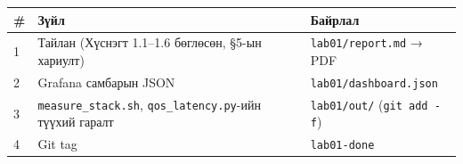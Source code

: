 \begingroup\scriptsize\begin{longtable}[]{@{}lll@{}}
\toprule
\begin{minipage}[b]{0.30\columnwidth}\raggedright
\#\strut
\end{minipage} & \begin{minipage}[b]{0.30\columnwidth}\raggedright
Зүйл\strut
\end{minipage} & \begin{minipage}[b]{0.30\columnwidth}\raggedright
Байрлал\strut
\end{minipage}\tabularnewline
\midrule
\endhead
\begin{minipage}[t]{0.30\columnwidth}\raggedright
1\strut
\end{minipage} & \begin{minipage}[t]{0.30\columnwidth}\raggedright
Тайлан (Хүснэгт 1.1--1.6 бөглөсөн, §5-ын хариулт)\strut
\end{minipage} & \begin{minipage}[t]{0.30\columnwidth}\raggedright
\texttt{lab01/report.md} → PDF\strut
\end{minipage}\tabularnewline
\begin{minipage}[t]{0.30\columnwidth}\raggedright
2\strut
\end{minipage} & \begin{minipage}[t]{0.30\columnwidth}\raggedright
Grafana самбарын JSON\strut
\end{minipage} & \begin{minipage}[t]{0.30\columnwidth}\raggedright
\texttt{lab01/\allowbreak{}dashboard.\allowbreak{}json}\strut
\end{minipage}\tabularnewline
\begin{minipage}[t]{0.30\columnwidth}\raggedright
3\strut
\end{minipage} & \begin{minipage}[t]{0.30\columnwidth}\raggedright
\texttt{measure\_\allowbreak{}stack.\allowbreak{}sh}, \texttt{qos\_latency.py}-ийн түүхий гаралт\strut
\end{minipage} & \begin{minipage}[t]{0.30\columnwidth}\raggedright
\texttt{lab01/out/} (\texttt{git\ add\ -f})\strut
\end{minipage}\tabularnewline
\begin{minipage}[t]{0.30\columnwidth}\raggedright
4\strut
\end{minipage} & \begin{minipage}[t]{0.30\columnwidth}\raggedright
Git tag\strut
\end{minipage} & \begin{minipage}[t]{0.30\columnwidth}\raggedright
\texttt{lab01-done}\strut
\end{minipage}\tabularnewline
\bottomrule
\end{longtable}\endgroup

